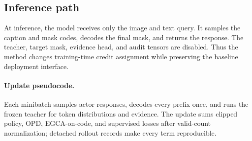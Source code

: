 \documentclass{article}
\begin{document}
\subsection{Inference path}At inference, the model receives only the image and text query. It samples the caption and mask codes, decodes the final mask, and returns the response. The teacher, target mask, evidence head, and audit tensors are disabled. Thus the method changes training-time credit assignment while preserving the baseline deployment interface.
\paragraph{Update pseudocode.}Each minibatch samples actor responses, decodes every prefix once, and runs the frozen teacher for token distributions and evidence. The update sums clipped policy, OPD, EGCA-on-code, and supervised losses after valid-count normalization; detached rollout records make every term reproducible.
\end{document}
